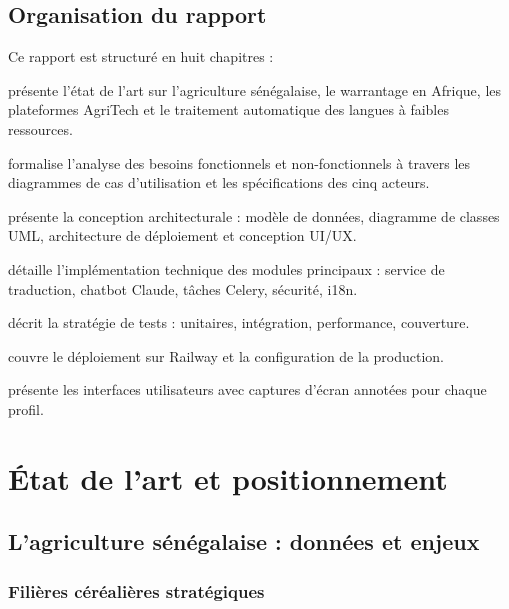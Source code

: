 \documentclass[12pt,a4paper,twoside]{report}
\begin{document}
\section{Organisation du rapport}

Ce rapport est structuré en huit chapitres :

\begin{description}[leftmargin=2cm]
  \item[Chapitre 2] présente l'état de l'art sur l'agriculture sénégalaise,
        le warrantage en Afrique, les plateformes AgriTech et le traitement
        automatique des langues à faibles ressources.
  \item[Chapitre 3] formalise l'analyse des besoins fonctionnels et non-fonctionnels
        à travers les diagrammes de cas d'utilisation et les spécifications des
        cinq acteurs.
  \item[Chapitre 4] présente la conception architecturale : modèle de données,
        diagramme de classes UML, architecture de déploiement et conception UI/UX.
  \item[Chapitre 5] détaille l'implémentation technique des modules principaux :
        service de traduction, chatbot Claude, tâches Celery, sécurité, i18n.
  \item[Chapitre 6] décrit la stratégie de tests : unitaires, intégration,
        performance, couverture.
  \item[Chapitre 7] couvre le déploiement sur Railway et la configuration de
        la production.
  \item[Chapitre 8] présente les interfaces utilisateurs avec captures d'écran
        annotées pour chaque profil.
\end{description}

\chapter{État de l'art et positionnement}

\section{L'agriculture sénégalaise : données et enjeux}

\subsection{Filières céréalières stratégiques}
\end{document}
